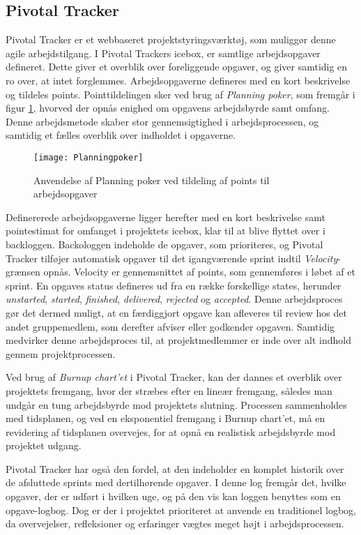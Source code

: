 	\subsection{Pivotal Tracker}
	\label{subsec:pivotal}
	Pivotal Tracker er et webbaseret projektstyringsværktøj, som muliggør denne agile arbejdstilgang. I Pivotal Trackers icebox, er samtlige arbejdsopgaver defineret. Dette giver et overblik over foreliggende opgaver, og giver samtidig en ro over, at intet forglemmes. Arbejdsopgaverne defineres med en kort beskrivelse og tildeles points. Pointtildelingen sker ved brug af \textit{Planning poker}, som fremgår i figur \ref{fig:planningpoker}, hvorved der opnås enighed om opgavens arbejdsbyrde samt omfang. Denne arbejdsmetode skaber stor gennemsigtighed i arbejdsprocessen, og samtidig et fælles overblik over indholdet i opgaverne. 
	
	\begin{figure}[htb]
	\centering
	\texttt{[image: Planningpoker]}
	\caption{Anvendelse af Planning poker ved tildeling af points til arbejdsopgaver}
	\label{fig:planningpoker}	
	\end{figure}
	 
	Definererede arbejdsopgaverne ligger herefter med en kort beskrivelse samt pointestimat for omfanget i projektets icebox, klar til at blive flyttet over i backloggen. Backologgen indeholde de opgaver, som prioriteres, og Pivotal Tracker tilføjer automatisk opgaver til det igangværende sprint indtil \textit{Velocity}-grænsen opnås. Velocity er gennemsnittet af points, som gennemføres i løbet af et sprint. En opgaves status defineres ud fra en række forskellige states, herunder \textit{unstarted}, \textit{started}, \textit{finished}, \textit{delivered}, \textit{rejected} og \textit{accepted}. Denne arbejdsproces gør det dermed muligt, at en færdiggjort opgave kan afleveres til review hos det andet gruppemedlem, som derefter afviser eller godkender opgaven. Samtidig medvirker denne arbejdsproces til, at projektmedlemmer er inde over alt indhold gennem projektprocessen.     
	
	Ved brug af \textit{Burnup chart'et} i Pivotal Tracker, kan der dannes et overblik over projektets fremgang, hvor der stræbes efter en lineær fremgang, således man undgår en tung arbejdsbyrde mod projektets slutning. Processen sammenholdes med tidsplanen, og ved en eksponentiel fremgang i Burnup chart'et, må en revidering af tidsplanen overvejes, for at opnå en realistisk arbejdsbyrde mod projektet udgang.  
	
	Pivotal Tracker har også den fordel, at den indeholder en komplet historik over de afsluttede sprints med dertilhørende opgaver. I denne log fremgår det, hvilke opgaver, der er udført i hvilken uge, og på den vis kan loggen benyttes som en opgave-logbog. Dog er der i projektet prioriteret at anvende en traditionel logbog, da overvejelser, refleksioner og erfaringer vægtes meget højt i arbejdsprocessen.      		
	
